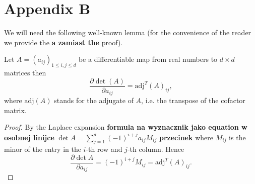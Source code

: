 \section{Appendix B}
\label{a2}

We will need the following well-known lemma (for the convenience of the reader we provide the \textbf{a zamiast the} proof).

\begin{lemma}\label{jacobi}
Let $A = (a_{ij})_{1 \leq i,j \leq d}$ be a differentiable map from real numbers to $d \times d$ matrices then
\begin{equation}
\frac{\partial \det(A)}{\partial a_{ij}} = \mathrm{adj}^T(A)_{ij},
\end{equation}
where $\mathrm{adj}(A)$ stands for the adjugate of $A$, i.e. the transpose of the cofactor matrix.
\end{lemma}

\begin{proof}
  By the Laplace expansion \textbf{formula na wyznacznik jako equation w osobnej linijce} $\det A = \sum\limits_{j=1}^{d} (-1)^{i+j} a_{ij} M_{ij}$ \textbf{przecinek} where $M_{ij}$ is the minor of the entry in the $i$-th row and $j$-th column. Hence
$$\frac{\partial \det A}{\partial a_{ij}} = (-1)^{i+j} M_{ij} = \mathrm{adj}^T(A)_{ij}.$$
\end{proof}

